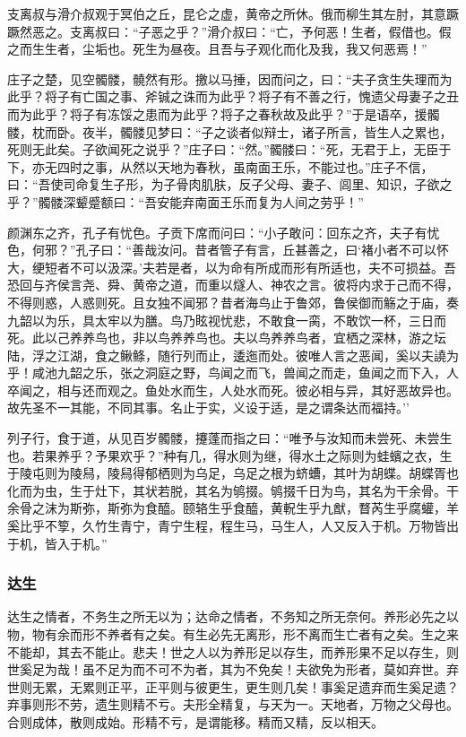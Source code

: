 \documentclass[]{article}
\begin{document}
支离叔与滑介叔观于冥伯之丘，昆仑之虚，黄帝之所休。俄而柳生其左肘，其意蹶蹶然恶之。支离叔曰：``子恶之乎？''滑介叔曰：``亡，予何恶！生者，假借也。假之而生生者，尘垢也。死生为昼夜。且吾与子观化而化及我，我又何恶焉！''

庄子之楚，见空髑髅，髐然有形。撽以马捶，因而问之，曰：``夫子贪生失理而为此乎？将子有亡国之事、斧铖之诛而为此乎？将子有不善之行，愧遗父母妻子之丑而为此乎？将子有冻馁之患而为此乎？将子之春秋故及此乎？''于是语卒，援髑髅，枕而卧。夜半，髑髅见梦曰：``子之谈者似辩士，诸子所言，皆生人之累也，死则无此矣。子欲闻死之说乎？''庄子曰：``然。''髑髅曰：``死，无君于上，无臣于下，亦无四时之事，从然以天地为春秋，虽南面王乐，不能过也。''庄子不信，曰：``吾使司命复生子形，为子骨肉肌肤，反子父母、妻子、闾里、知识，子欲之乎？''髑髅深颦蹙额曰：``吾安能弃南面王乐而复为人间之劳乎！''

颜渊东之齐，孔子有忧色。子贡下席而问曰：``小子敢问：回东之齐，夫子有忧色，何邪？''孔子曰：``善哉汝问。昔者管子有言，丘甚善之，曰`褚小者不可以怀大，绠短者不可以汲深。'夫若是者，以为命有所成而形有所适也，夫不可损益。吾恐回与齐侯言尧、舜、黄帝之道，而重以燧人、神农之言。彼将内求于己而不得，不得则惑，人惑则死。且女独不闻邪？昔者海鸟止于鲁郊，鲁侯御而觞之于庙，奏九韶以为乐，具太牢以为膳。鸟乃眩视忧悲，不敢食一脔，不敢饮一杯，三日而死。此以己养养鸟也，非以鸟养养鸟也。夫以鸟养养鸟者，宜栖之深林，游之坛陆，浮之江湖，食之鳅鲦，随行列而止，逶迤而处。彼唯人言之恶闻，奚以夫譊为乎！咸池九韶之乐，张之洞庭之野，鸟闻之而飞，兽闻之而走，鱼闻之而下入，人卒闻之，相与还而观之。鱼处水而生，人处水而死。彼必相与异，其好恶故异也。故先圣不一其能，不同其事。名止于实，义设于适，是之谓条达而福持。''

列子行，食于道，从见百岁髑髅，攓蓬而指之曰：``唯予与汝知而未尝死、未尝生也。若果养乎？予果欢乎？''种有几，得水则为继，得水土之际则为蛙蠙之衣，生于陵屯则为陵舄，陵舄得郁栖则为乌足，乌足之根为蛴螬，其叶为胡蝶。胡蝶胥也化而为虫，生于灶下，其状若脱，其名为鸲掇。鸲掇千日为鸟，其名为干余骨。干余骨之沫为斯弥，斯弥为食醯。颐辂生乎食醯，黄軦生乎九猷，瞀芮生乎腐蠸，羊奚比乎不箰，久竹生青宁，青宁生程，程生马，马生人，人又反入于机。万物皆出于机，皆入于机。''

\hypertarget{header-n317}{%
\subsubsection{达生}\label{header-n317}}

达生之情者，不务生之所无以为；达命之情者，不务知之所无奈何。养形必先之以物，物有余而形不养者有之矣。有生必先无离形，形不离而生亡者有之矣。生之来不能却，其去不能止。悲夫！世之人以为养形足以存生，而养形果不足以存生，则世奚足为哉！虽不足为而不可不为者，其为不免矣！夫欲免为形者，莫如弃世。弃世则无累，无累则正平，正平则与彼更生，更生则几矣！事奚足遗弃而生奚足遗？弃事则形不劳，遗生则精不亏。夫形全精复，与天为一。天地者，万物之父母也。合则成体，散则成始。形精不亏，是谓能移。精而又精，反以相天。
\end{document}
